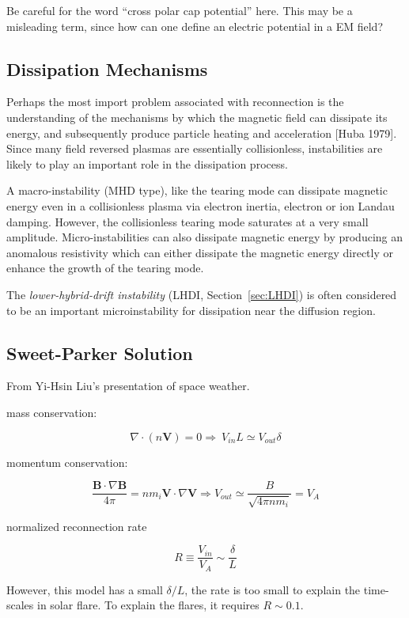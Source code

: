 \documentclass[
  notoc %
]{tufte-book}
\begin{document}
Be careful for the word ``cross polar cap potential'' here. This may be
a misleading term, since how can one define an electric potential in a
EM field?

\hypertarget{dissipation-mechanisms}{%
\subsection{Dissipation Mechanisms}\label{dissipation-mechanisms}}

Perhaps the most import problem associated with reconnection is the
understanding of the mechanisms by which the magnetic field can
dissipate its energy, and subsequently produce particle heating and
acceleration {[}Huba 1979{]}. Since many field reversed plasmas are
essentially collisionless, instabilities are likely to play an important
role in the dissipation process.

A macro-instability (MHD type), like the tearing mode can dissipate
magnetic energy even in a collisionless plasma via electron inertia,
electron or ion Landau damping. However, the collisionless tearing mode
saturates at a very small amplitude. Micro-instabilities can also
dissipate magnetic energy by producing an anomalous resistivity which
can either dissipate the magnetic energy directly or enhance the growth
of the tearing mode.

The \emph{lower-hybrid-drift instability} (LHDI, Section~\ref{sec:LHDI})
is often considered to be an important microinstability for dissipation
near the diffusion region.

\hypertarget{sweet-parker-solution}{%
\subsection{Sweet-Parker Solution}\label{sweet-parker-solution}}

From Yi-Hsin Liu's presentation of space weather.

mass conservation:

\[
\nabla\cdot(n\mathbf{V})=0 \Rightarrow\ V_{in}L \simeq V_{out}\delta
\]

momentum conservation:

\[
\frac{\mathbf{B}\cdot\nabla\mathbf{B}}{4\pi} = nm_i \mathbf{V}\cdot\nabla\mathbf{V} \Rightarrow V_{out}\simeq \frac{B}{\sqrt{4\pi nm_i}} = V_A
\]

normalized reconnection rate

\[
R\equiv\frac{V_{in}}{V_A}\sim\frac{\delta}{L}
\]

However, this model has a small \(\delta/L\), the rate is too small to
explain the time-scales in solar flare. To explain the flares, it
requires \(R\sim 0.1\).
\end{document}
